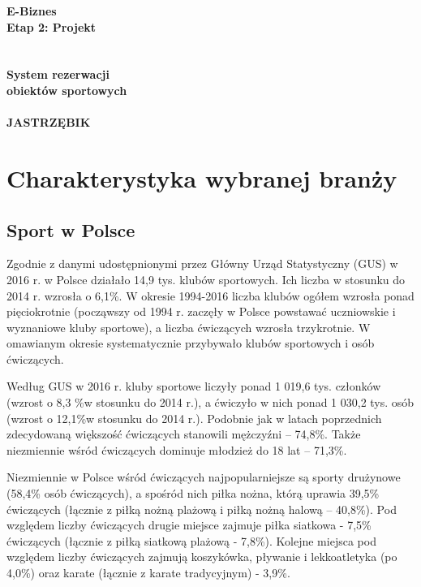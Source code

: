 \documentclass[a4paper,11pt]{article}
\begin{document}
\begin{titlepage}
\begin{center}
\textbf{\huge{E-Biznes}}
\textbf{\LARGE{\\Etap 2: Projekt}}
\textbf{\Huge{\\~\\~\\System rezerwacji\\obiektów sportowych\\~\\ JASTRZĘBIK}} 
\end{center}

\end{titlepage}

\setcounter{page}{2}

\tableofcontents
{}
\newpage

\section{Charakterystyka wybranej branży}

    \subsection{Sport w Polsce}
        Zgodnie z danymi udostępnionymi przez Główny Urząd Statystyczny (GUS) w 2016 r. w Polsce działało 14,9 tys. klubów sportowych. Ich liczba w stosunku do 2014 r. wzrosła o 6,1\%. W okresie 1994-2016 liczba klubów ogółem wzrosła ponad pięciokrotnie (począwszy od 1994 r. zaczęły w Polsce powstawać uczniowskie i wyznaniowe kluby sportowe), a liczba ćwiczących wzrosła trzykrotnie. W omawianym okresie systematycznie przybywało klubów sportowych i osób ćwiczących. 
    
        Według GUS w 2016 r. kluby sportowe liczyły ponad 1 019,6 tys. członków (wzrost o 8,3 \%w stosunku do 2014 r.), a ćwiczyło w nich ponad 1 030,2 tys. osób (wzrost o 12,1\%w stosunku do 2014 r.). Podobnie jak w latach poprzednich zdecydowaną większość ćwiczących stanowili mężczyźni – 74,8\%. Także niezmiennie wśród ćwiczących dominuje młodzież do 18 lat – 71,3\%. 

        Niezmiennie w Polsce wśród ćwiczących najpopularniejsze są sporty drużynowe (58,4\% osób ćwiczących), a spośród nich piłka nożna, którą uprawia 39,5\% ćwiczących (łącznie z piłką nożną plażową i piłką nożną halową – 40,8\%). Pod względem liczby ćwiczących drugie miejsce zajmuje piłka siatkowa - 7,5\% ćwiczących (łącznie z piłką siatkową plażową - 7,8\%). Kolejne miejsca pod względem liczby ćwiczących zajmują koszykówka, pływanie i lekkoatletyka (po 4,0\%) oraz karate (łącznie z karate tradycyjnym) - 3,9\%. 
\end{document}
